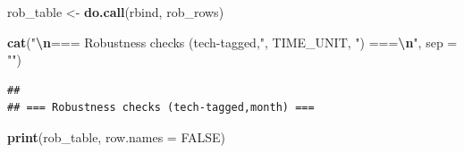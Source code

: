 \documentclass[
]{article}
\newenvironment{Shaded}{\begin{snugshade}}{\end{snugshade}}
\newcommand{\AttributeTok}[1]{\textcolor[rgb]{0.13,0.29,0.53}{#1}}
\newcommand{\ConstantTok}[1]{\textcolor[rgb]{0.56,0.35,0.01}{#1}}
\newcommand{\FunctionTok}[1]{\textcolor[rgb]{0.13,0.29,0.53}{\textbf{#1}}}
\newcommand{\NormalTok}[1]{#1}
\newcommand{\OtherTok}[1]{\textcolor[rgb]{0.56,0.35,0.01}{#1}}
\newcommand{\SpecialCharTok}[1]{\textcolor[rgb]{0.81,0.36,0.00}{\textbf{#1}}}
\newcommand{\StringTok}[1]{\textcolor[rgb]{0.31,0.60,0.02}{#1}}
\begin{document}
\begin{Shaded}
\begin{Highlighting}[]
\NormalTok{rob\_table }\OtherTok{\textless{}{-}} \FunctionTok{do.call}\NormalTok{(rbind, rob\_rows)}

\FunctionTok{cat}\NormalTok{(}\StringTok{"}\SpecialCharTok{\textbackslash{}n}\StringTok{=== Robustness checks (tech{-}tagged,"}\NormalTok{, TIME\_UNIT, }\StringTok{") ===}\SpecialCharTok{\textbackslash{}n}\StringTok{"}\NormalTok{, }\AttributeTok{sep =} \StringTok{""}\NormalTok{)}
\end{Highlighting}
\end{Shaded}

\begin{verbatim}
## 
## === Robustness checks (tech-tagged,month) ===
\end{verbatim}

\begin{Shaded}
\begin{Highlighting}[]
\FunctionTok{print}\NormalTok{(rob\_table, }\AttributeTok{row.names =} \ConstantTok{FALSE}\NormalTok{)}
\end{Highlighting}
\end{Shaded}
\end{document}
